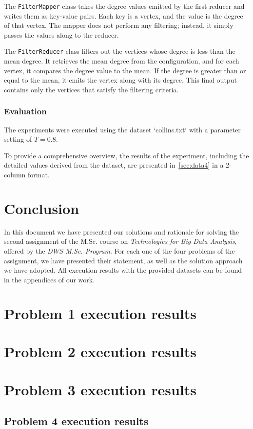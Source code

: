 \documentclass[acmlarge]{acmart}
\begin{document}
The \texttt{FilterMapper} class takes the degree values emitted by the first reducer and writes them as key-value pairs.
Each key is a vertex, and the value is the degree of that vertex.
The mapper does not perform any filtering; instead, it simply passes the values along to the reducer.

The \texttt{FilterReducer} class filters out the vertices whose degree is less than the mean degree.
It retrieves the mean degree from the configuration, and for each vertex, it compares the degree value to the mean.
If the degree is greater than or equal to the mean, it emits the vertex along with its degree.
This final output contains only the vertices that satisfy the filtering criteria.

\subsubsection{Evaluation}
The experiments were executed using the dataset `collins.txt` with a parameter setting of \( T = 0.8 \).

To provide a comprehensive overview, the results of the experiment, including the detailed values derived from the
dataset, are presented in~\autoref{sec:data4} in a 2-column format.



\section{Conclusion}
\label{sec:conclusion}
In this document we have presented our solutions and rationale for solving the second assignment of the M.Sc.
course on \emph{Technologies for Big Data Analysis}, offered by the \emph{DWS M.Sc. Program}. For each one of the four problems of the assignment, we have presented their statement, as well as the solution approach we have adopted. All execution results with the provided datasets can be found in the appendices of our work.

\newpage
\appendix
\section{Problem 1 execution results}
\label{sec:data1}


\section{Problem 2 execution results}
\label{sec:data2}


\section{Problem 3 execution results}
\label{sec:data3}


\subsection{Problem 4 execution results}
\label{sec:data4}

\end{document}
